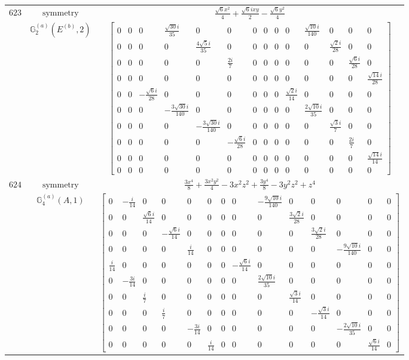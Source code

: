 \documentclass[fleqn,8pt,landscape]{jsarticle}
\begin{document}
\begin{longtable}{ccc}
$ 623 $ & $ \text{symmetry} $ & $ \frac{\sqrt{6} x^{2}}{4} + \frac{\sqrt{6} i x y}{2} - \frac{\sqrt{6} y^{2}}{4} $ \\
$  $ & $ \mathbb{G}_{2}^{(a)}(E^{(b)},2) $ & $ \begin{bmatrix} 0 & 0 & 0 & \frac{\sqrt{30} i}{35} & 0 & 0 & 0 & 0 & 0 & 0 & \frac{\sqrt{10} i}{140} & 0 & 0 & 0 \\ 0 & 0 & 0 & 0 & \frac{4 \sqrt{5} i}{35} & 0 & 0 & 0 & 0 & 0 & 0 & \frac{\sqrt{2} i}{28} & 0 & 0 \\ 0 & 0 & 0 & 0 & 0 & \frac{2 i}{7} & 0 & 0 & 0 & 0 & 0 & 0 & \frac{\sqrt{6} i}{28} & 0 \\ 0 & 0 & 0 & 0 & 0 & 0 & 0 & 0 & 0 & 0 & 0 & 0 & 0 & \frac{\sqrt{14} i}{28} \\ 0 & 0 & - \frac{\sqrt{6} i}{28} & 0 & 0 & 0 & 0 & 0 & 0 & \frac{\sqrt{2} i}{14} & 0 & 0 & 0 & 0 \\ 0 & 0 & 0 & - \frac{3 \sqrt{30} i}{140} & 0 & 0 & 0 & 0 & 0 & 0 & \frac{2 \sqrt{10} i}{35} & 0 & 0 & 0 \\ 0 & 0 & 0 & 0 & - \frac{3 \sqrt{30} i}{140} & 0 & 0 & 0 & 0 & 0 & 0 & \frac{\sqrt{3} i}{7} & 0 & 0 \\ 0 & 0 & 0 & 0 & 0 & - \frac{\sqrt{6} i}{28} & 0 & 0 & 0 & 0 & 0 & 0 & \frac{2 i}{7} & 0 \\ 0 & 0 & 0 & 0 & 0 & 0 & 0 & 0 & 0 & 0 & 0 & 0 & 0 & \frac{\sqrt{14} i}{14} \\ 0 & 0 & 0 & 0 & 0 & 0 & 0 & 0 & 0 & 0 & 0 & 0 & 0 & 0 \end{bmatrix} $ \\ \hline
$ 624 $ & $ \text{symmetry} $ & $ \frac{3 x^{4}}{8} + \frac{3 x^{2} y^{2}}{4} - 3 x^{2} z^{2} + \frac{3 y^{4}}{8} - 3 y^{2} z^{2} + z^{4} $ \\
$  $ & $ \mathbb{G}_{4}^{(a)}(A,1) $ & $ \begin{bmatrix} 0 & - \frac{i}{14} & 0 & 0 & 0 & 0 & 0 & 0 & - \frac{9 \sqrt{10} i}{140} & 0 & 0 & 0 & 0 & 0 \\ 0 & 0 & \frac{\sqrt{6} i}{14} & 0 & 0 & 0 & 0 & 0 & 0 & \frac{3 \sqrt{2} i}{28} & 0 & 0 & 0 & 0 \\ 0 & 0 & 0 & - \frac{\sqrt{6} i}{14} & 0 & 0 & 0 & 0 & 0 & 0 & \frac{3 \sqrt{2} i}{28} & 0 & 0 & 0 \\ 0 & 0 & 0 & 0 & \frac{i}{14} & 0 & 0 & 0 & 0 & 0 & 0 & - \frac{9 \sqrt{10} i}{140} & 0 & 0 \\ \frac{i}{14} & 0 & 0 & 0 & 0 & 0 & 0 & - \frac{\sqrt{6} i}{14} & 0 & 0 & 0 & 0 & 0 & 0 \\ 0 & - \frac{3 i}{14} & 0 & 0 & 0 & 0 & 0 & 0 & \frac{2 \sqrt{10} i}{35} & 0 & 0 & 0 & 0 & 0 \\ 0 & 0 & \frac{i}{7} & 0 & 0 & 0 & 0 & 0 & 0 & \frac{\sqrt{3} i}{14} & 0 & 0 & 0 & 0 \\ 0 & 0 & 0 & \frac{i}{7} & 0 & 0 & 0 & 0 & 0 & 0 & - \frac{\sqrt{3} i}{14} & 0 & 0 & 0 \\ 0 & 0 & 0 & 0 & - \frac{3 i}{14} & 0 & 0 & 0 & 0 & 0 & 0 & - \frac{2 \sqrt{10} i}{35} & 0 & 0 \\ 0 & 0 & 0 & 0 & 0 & \frac{i}{14} & 0 & 0 & 0 & 0 & 0 & 0 & \frac{\sqrt{6} i}{14} & 0 \end{bmatrix} $ \\ \hline

\end{longtable}
\end{document}
